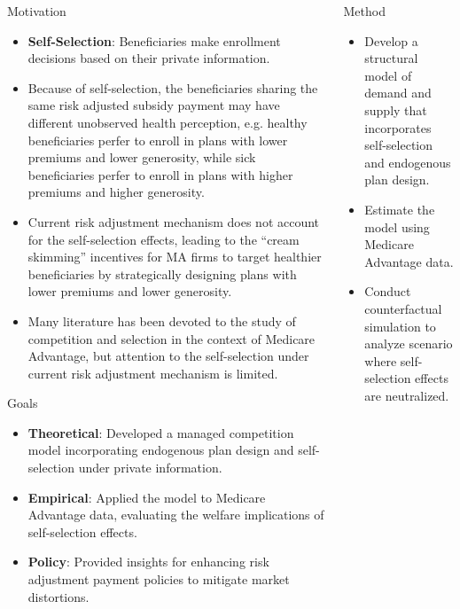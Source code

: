 \documentclass{beamer}
\begin{document}
\begin{frame}[t]
\begin{columns}[t]
\begin{column}{.25\textwidth}
      \begin{block}{Motivation}
        \begin{itemize}
          \item \textbf{Self-Selection}: Beneficiaries make enrollment decisions based on their private information.
          \item Because of self-selection, the beneficiaries sharing the same risk adjusted subsidy payment may have different unobserved health perception, e.g. healthy beneficiaries perfer to enroll in plans with lower premiums and lower generosity, while sick beneficiaries perfer to enroll in plans with higher premiums and higher generosity.
          \item Current risk adjustment mechanism does not account for the self-selection effects, leading to the ``cream skimming'' incentives for MA firms to target healthier beneficiaries by strategically designing plans with lower premiums and lower generosity.
          \item Many literature has been devoted to the study of competition and selection in the context of Medicare Advantage, but attention to the self-selection under current risk adjustment mechanism is limited.
        \end{itemize}
      \end{block}
      \begin{block}{Goals}
        \begin{itemize}
          \item \textbf{Theoretical}: Developed a managed competition model incorporating endogenous plan design and self-selection under private information.
          \item \textbf{Empirical}: Applied the model to Medicare Advantage data, evaluating the welfare implications of self-selection effects.
          \item \textbf{Policy}: Provided insights for enhancing risk adjustment payment policies to mitigate market distortions.
        \end{itemize}
      \end{block}
    \end{column}
    \begin{column}{.3\textwidth}

      \begin{block}{Method}
        \begin{itemize}
          \item Develop a structural model of demand and supply that incorporates self-selection and endogenous plan design.
          \item Estimate the model using Medicare Advantage data.
          \item Conduct counterfactual simulation to analyze scenario where self-selection effects are neutralized.
        \end{itemize}
      \end{block}


\end{column}
\end{columns}
\end{frame}
\end{document}
